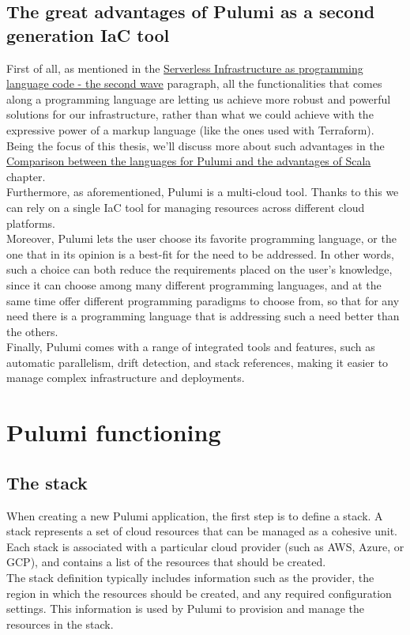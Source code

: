 \subsection{The great advantages of Pulumi as a second generation IaC tool}
First of all, as mentioned in the \hyperref[sssec:second-wave]{Serverless Infrastructure as programming language code - the second wave} paragraph, all the functionalities that comes along a programming language are letting us achieve more robust and powerful solutions for our infrastructure, rather than what we could achieve with the expressive power of a markup language (like the ones used with \gls{Terraform}).
Being the focus of this thesis, we'll discuss more about such advantages in the \hyperref[cap:comparisons]{Comparison between the languages for Pulumi and the advantages of Scala} chapter.\\
Furthermore, as aforementioned, Pulumi is a multi-cloud tool. Thanks to this we can rely on a single IaC tool for managing resources across different cloud platforms.\\
Moreover, Pulumi lets the user choose its favorite programming language, or the one that in its opinion is a best-fit for the need to be addressed.
In other words, such a choice can both reduce the requirements placed on the user's knowledge, since it can choose among many different programming languages, 
and at the same time offer different programming paradigms to choose from, so that for any need there is a programming language that is addressing such a need better than the others.\\
Finally, Pulumi comes with a range of integrated tools and features, such as automatic parallelism, drift detection, and stack references, making it easier to manage complex infrastructure and deployments.

\section{Pulumi functioning}


\subsection{The stack}
When creating a new Pulumi application, the first step is to define a stack.
A stack represents a set of cloud resources that can be managed as a cohesive unit.
Each stack is associated with a particular cloud provider (such as AWS, Azure, or GCP), and contains a list of the resources that should be created.\\
The stack definition typically includes information such as the provider, the region in which the resources should be created, and any required configuration settings.
This information is used by Pulumi to provision and manage the resources in the stack.

